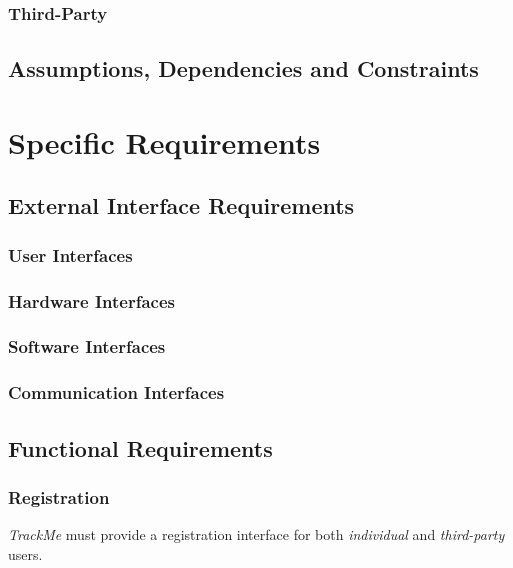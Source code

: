\documentclass[a4paper]{article}
\begin{document}
        \subsubsection{Third-Party}
        
    \subsection{Assumptions, Dependencies and Constraints}
    
\newpage
\section{Specific Requirements}

    \subsection{External Interface Requirements}
        
        \subsubsection{User Interfaces}
        
        \subsubsection{Hardware Interfaces}
        
        \subsubsection{Software Interfaces}
        
        \subsubsection{Communication Interfaces}
    
    \subsection{Functional Requirements}
    
        \subsubsection{Registration}
        \textit{TrackMe} must provide a registration interface for both \textit{individual} and \textit{third-party} users.
        
\end{document}
